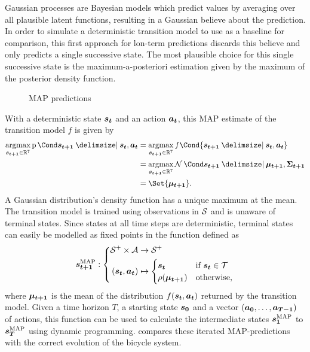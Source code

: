 Gaussian processes are Bayesian models which predict values by averaging over all plausible latent functions, resulting in a Gaussian believe about the prediction.
In order to simulate a deterministic transition model to use as a baseline for comparison, this first approach for lon-term predictions discards this believe and only predicts a single successive state.
The most plausible choice for this single successive state is the maximum-a-posteriori estimation given by the maximum of the posterior density function.

\begin{figure}[t]
    \centering
    \caption{MAP predictions}
    \label{fig:map_predictions}
\end{figure}
With a deterministic state $\bm{s_t}$ and an action $\bm{a_t}$, this MAP estimate of the transition model $f$ is given by
\begin{align}
    \argmax_{\mat{s_{t+1}} \in \R^7} \Prob{\mat{s_{t+1}} \given \mat{s_t}, \mat{a_t}} &= \argmax_{\mat{s_{t+1}} \in \R^7} f\Cond{\mat{s_{t+1}} \given \mat{s_t}, \mat{a_t}} \\
    &= \argmax_{\mat{s_{t+1}} \in \R^7} \Gaussian{\mat{s_{t+1}} \given \mat{\mu_{t+1}}, \mat{\Sigma_{t+1}}} \\
    &= \Set{\mat{\mu_{t+1}}}.
\end{align}
A Gaussian distribution's density function has a unique maximum at the mean.
The transition model is trained using observations in $\mathcal{S}$ and is unaware of terminal states.
Since states at all time steps are deterministic, terminal states can easily be modelled as fixed points in the function defined as
\begin{align}
    \map{\mat{s_{t+1}}} : \left\{
        \begin{aligned}
            \Es^+ \times \Ah &\to \Es^+ \\
            (\mat{s_t}, \mat{a_t}) &\mapsto \begin{cases}
            \mat{s_t} & \text{if $\mat{s_t} \in \Tee$} \\
            \squeeze(\mat{\mu_{t+1}}) & \text{otherwise,}
        \end{cases}
    \end{aligned}
    \right.
\end{align}
where $\bm{\mu_{t+1}}$ is the mean of the distribution $f(\bm{s_t}, \bm{a_t})$ returned by the transition model.
Given a time horizon $T$, a starting state $\bm{s_0}$ and a vector $(\bm{a_0}, \dots, \bm{a_{T-1}})$ of actions, this function can be used to calculate the intermediate states $\bm{s_1}^{\text{MAP}}$ to $\bm{s_T}^{\text{MAP}}$ using dynamic programming.  compares these iterated MAP-predictions with the correct evolution of the bicycle system.


